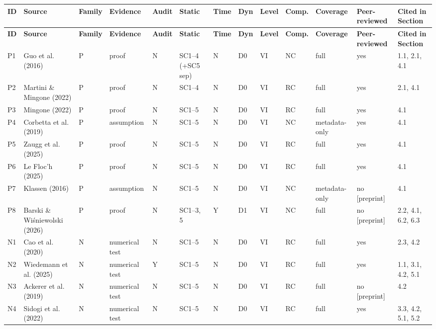 \documentclass[11pt]{article}
\begin{document}
\begingroup\scriptsize\setlength{\tabcolsep}{2.5pt}
\begin{longtable}{@{}p{}p{}p{}p{}p{}p{}p{}p{}p{}p{}p{}p{}p{}@{}}
\toprule
\textbf{ID} & \textbf{Source} & \textbf{Family} & \textbf{Evidence} & \textbf{Audit} & \textbf{Static} & \textbf{Time} & \textbf{Dyn} & \textbf{Level} & \textbf{Comp.} & \textbf{Coverage} & \textbf{Peer-reviewed} & \textbf{Cited in Section} \\
\midrule
\endfirsthead
\toprule
\textbf{ID} & \textbf{Source} & \textbf{Family} & \textbf{Evidence} & \textbf{Audit} & \textbf{Static} & \textbf{Time} & \textbf{Dyn} & \textbf{Level} & \textbf{Comp.} & \textbf{Coverage} & \textbf{Peer-reviewed} & \textbf{Cited in Section} \\
\midrule
\endhead
P1 & Guo et al. (2016) & P & proof & N & SC1–4 (+SC5 sep) & N & D0 & VI & NC & full & yes & 1.1, 2.1, 4.1 \\
P2 & Martini \& Mingone (2022) & P & proof & N & SC1–4 & N & D0 & VI & RC & full & yes & 2.1, 4.1 \\
P3 & Mingone (2022) & P & proof & N & SC1–5 & N & D0 & VI & RC & full & yes & 4.1 \\
P4 & Corbetta et al. (2019) & P & assumption & N & SC1–5 & N & D0 & VI & NC & metadata-only & yes & 4.1 \\
P5 & Zaugg et al. (2025) & P & proof & N & SC1–5 & N & D0 & VI & RC & full & yes & 4.1 \\
P6 & Le Floc’h (2025) & P & proof & N & SC1–5 & N & D0 & VI & RC & full & yes & 4.1 \\
P7 & Klassen (2016) & P & assumption & N & SC1–5 & N & D0 & VI & NC & metadata-only & no [preprint] & 4.1 \\
P8 & Barski \& Wiśniewolski (2026) & P & proof & N & SC1–3, 5 & Y & D1 & VI & NC & full & no [preprint] & 2.2, 4.1, 6.2, 6.3 \\
N1 & Cao et al. (2020) & N & numerical test & N & SC1–5 & N & D0 & VI & RC & full & yes & 2.3, 4.2 \\
N2 & Wiedemann et al. (2025) & N & numerical test & Y & SC1–5 & N & D0 & VI & RC & full & yes & 1.1, 3.1, 4.2, 5.1 \\
N3 & Ackerer et al. (2019) & N & numerical test & N & SC1–5 & N & D0 & VI & RC & full & no [preprint] & 4.2 \\
N4 & Sidogi et al. (2022) & N & numerical test & N & SC1–5 & N & D0 & VI & RC & full & yes & 3.3, 4.2, 5.1, 5.2 \\

\end{longtable}
\end{document}

